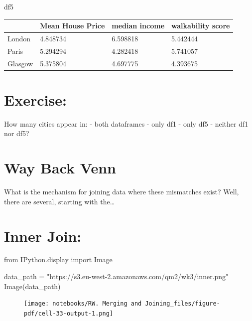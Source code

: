 \documentclass[
  letterpaper,
  DIV=11,
  numbers=noendperiod]{scrreprt}
\newenvironment{Shaded}{\begin{snugshade}}{\end{snugshade}}
\newcommand{\ImportTok}[1]{\textcolor[rgb]{0.00,0.46,0.62}{#1}}
\newcommand{\NormalTok}[1]{\textcolor[rgb]{0.00,0.23,0.31}{#1}}
\newcommand{\OperatorTok}[1]{\textcolor[rgb]{0.37,0.37,0.37}{#1}}
\newcommand{\StringTok}[1]{\textcolor[rgb]{0.13,0.47,0.30}{#1}}
\begin{document}
\begin{Shaded}
\begin{Highlighting}[]
\NormalTok{df5}
\end{Highlighting}
\end{Shaded}

\begin{longtable}[]{@{}llll@{}}
\toprule\noalign{}
& Mean House Price & median income & walkability score \\
\midrule\noalign{}
\endhead
\bottomrule\noalign{}
\endlastfoot
London & 4.848734 & 6.598818 & 5.442444 \\
Paris & 5.294294 & 4.282418 & 5.741057 \\
Glasgow & 5.375804 & 4.697775 & 4.393675 \\
\end{longtable}

\hypertarget{exercise-17}{%
\section{Exercise:}\label{exercise-17}}

How many cities appear in: - both dataframes - only df1 - only df5 -
neither df1 nor df5?

\hypertarget{way-back-venn}{%
\section{Way Back Venn}\label{way-back-venn}}

What is the mechanism for joining data where these mismatches exist?
Well, there are several, starting with the\ldots{}

\hypertarget{inner-join}{%
\section{Inner Join:}\label{inner-join}}

\begin{Shaded}
\begin{Highlighting}[]
\ImportTok{from}\NormalTok{ IPython.display }\ImportTok{import}\NormalTok{ Image}

\NormalTok{data\_path }\OperatorTok{=} \StringTok{"https://s3.eu{-}west{-}2.amazonaws.com/qm2/wk3/inner.png"}
\NormalTok{Image(data\_path)}
\end{Highlighting}
\end{Shaded}

\begin{figure}[H]

{\centering \texttt{[image: notebooks/RW. Merging and Joining\_files/figure-pdf/cell-33-output-1.png]}

}

\end{figure}
\end{document}
